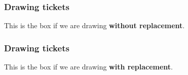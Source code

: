 \documentclass[handout]{beamer}
\begin{document}


   \begin{frame}
   \frametitle{Drawing tickets}
   \begin{center}
   \end{center}
   This is the box if we are drawing {\bf without replacement}.
   \end{frame}



   \begin{frame}
   \frametitle{Drawing tickets}
   \begin{center}
   \end{center}
   This is the box if we are drawing {\bf with replacement}.
   \end{frame}
\end{document}

